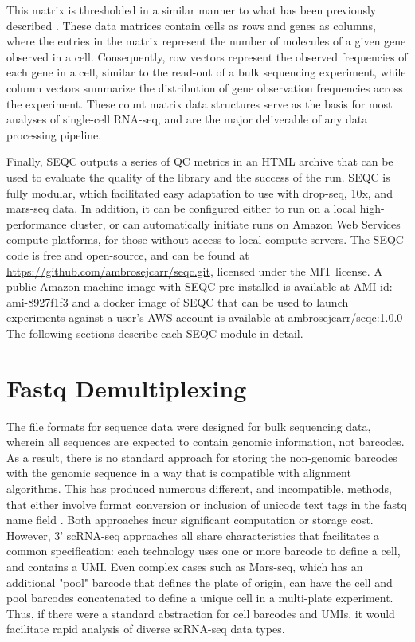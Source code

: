 This matrix is thresholded in a similar manner to what has been previously described \citep{Macosko2015,Zheng2017a}. 
These data matrices contain cells as rows and genes as columns, where the entries in the matrix represent the number of molecules of a given gene observed in a cell. 
Consequently, row vectors represent the observed frequencies of each gene in a cell, similar to the read-out of a bulk sequencing experiment, while column vectors summarize the distribution of gene observation frequencies across the experiment. 
These count matrix data structures serve as the basis for most analyses of single-cell RNA-seq, and are the major deliverable of any data processing pipeline. 

Finally, SEQC outputs a series of QC metrics in an HTML archive that can be used to evaluate the quality of the library and the success of the run. 
SEQC is fully modular, which facilitated easy adaptation to use with drop-seq, 10x, and mars-seq data.  
In addition, it can be configured either to run on a local high-performance cluster, or can automatically initiate runs on Amazon Web Services compute platforms, for those without access to local compute servers. 
The SEQC code is free and open-source, and can be found at \href{https://github.com/ambrosejcarr/seqc.git}{https://github.com/ambrosejcarr/seqc.git}, licensed under the MIT license. 
A public Amazon machine image with SEQC pre-installed is available at AMI id: {\mono ami-8927f1f3} and a docker image of SEQC that can be used to launch experiments against a user's AWS account is available at {\mono ambrosejcarr/seqc:1.0.0}
The following sections describe each SEQC module in detail. 

\section{Fastq Demultiplexing}

The file formats for sequence data were designed for bulk sequencing data, wherein all sequences are expected to contain genomic information, not barcodes.
As a result, there is no standard approach for storing the non-genomic barcodes with the genomic sequence in a way that is compatible with alignment algorithms.
This has produced numerous different, and incompatible, methods, that either involve format conversion \citep{Macosko2015} or inclusion of unicode text tags in the fastq name field \citep{Jaitin2014}. 
Both approaches incur significant computation or storage cost.
However, 3' scRNA-seq approaches all share characteristics that facilitates a common specification: each technology uses one or more barcode to define a cell, and contains a UMI\@. 
Even complex cases such as Mars-seq, which has an additional "pool" barcode that defines the plate of origin, can have the cell and pool barcodes concatenated to define a unique cell in a multi-plate experiment.
Thus, if there were a standard abstraction for cell barcodes and UMIs, it would facilitate rapid analysis of diverse scRNA-seq data types.


